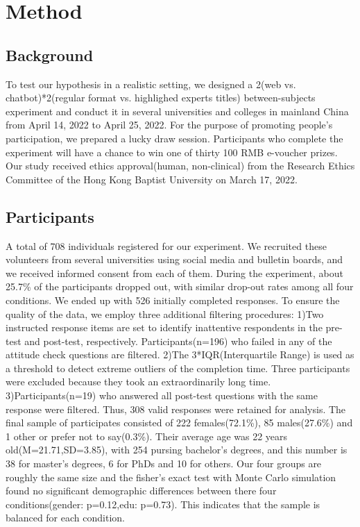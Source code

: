 \section{Method}
\subsection{Background}
To test our hypothesis in a realistic setting,  we designed a 2(web vs. chatbot)*2(regular format vs. highlighed experts titles) between-subjects experiment and conduct it in several universities and colleges in mainland China from April 14, 2022 to April 25, 2022.
For the purpose of promoting people's participation, we prepared a lucky draw session. Participants who complete the experiment will have a chance to win one of thirty 100 RMB e-voucher prizes.
Our study received ethics approval(human, non-clinical) from the Research Ethics Committee of the Hong Kong Baptist University on March 17, 2022.
\subsection{Participants}
A total of 708 individuals registered for our experiment. We recruited these volunteers from several universities using social media and bulletin boards, and we received informed consent from each of them.
During the experiment, about 25.7\% of the participants dropped out, with similar drop-out rates among all four conditions. We ended up with 526 initially completed responses.
To ensure the quality of the data, we employ three additional filtering  procedures: 
1)Two instructed response items are set to identify inattentive respondents in the pre-test and post-test, respectively. 
Participants(n=196) who failed in any of the attitude check questions are filtered.
2)The 3*IQR(Interquartile Range) is used as a threshold to detect extreme outliers of the completion time. 
Three participants were excluded because they took an extraordinarily long time. 
3)Participants(n=19) who answered all post-test questions with the same response were filtered.
Thus, 308 valid responses were retained for analysis. The final sample of participates consisted of 222 females(72.1\%), 85 males(27.6\%) and 1 other or prefer not to say(0.3\%).
Their average age was 22 years old(M=21.71,SD=3.85), with 254 pursing bachelor's degrees, and this number is 38 for master's degrees, 6 for PhDs and 10 for others. 
Our four groups are roughly the same size and the fisher's exact test with Monte Carlo simulation found no significant demographic differences between there four conditions(gender: p=0.12,edu: p=0.73).
This indicates that the sample is balanced for each condition.

